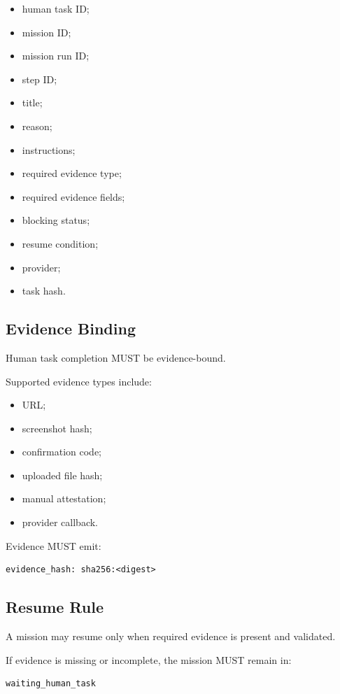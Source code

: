 \begin{itemize}
  \item human task ID;
  \item mission ID;
  \item mission run ID;
  \item step ID;
  \item title;
  \item reason;
  \item instructions;
  \item required evidence type;
  \item required evidence fields;
  \item blocking status;
  \item resume condition;
  \item provider;
  \item task hash.
\end{itemize}

\subsection{Evidence Binding}

Human task completion MUST be evidence-bound.

Supported evidence types include:

\begin{itemize}
  \item URL;
  \item screenshot hash;
  \item confirmation code;
  \item uploaded file hash;
  \item manual attestation;
  \item provider callback.
\end{itemize}

Evidence MUST emit:

\begin{verbatim}
evidence_hash: sha256:<digest>
\end{verbatim}

\subsection{Resume Rule}

A mission may resume only when required evidence is present and validated.

If evidence is missing or incomplete, the mission MUST remain in:

\begin{verbatim}
waiting_human_task
\end{verbatim}

